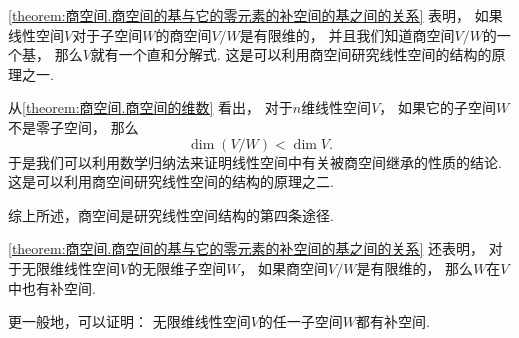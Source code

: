 \cref{theorem:商空间.商空间的基与它的零元素的补空间的基之间的关系} 表明，
如果线性空间\(V\)对于子空间\(W\)的商空间\(V/W\)是有限维的，
并且我们知道商空间\(V/W\)的一个基，
那么\(V\)就有一个直和分解式.
这是可以利用商空间研究线性空间的结构的原理之一.

从\cref{theorem:商空间.商空间的维数} 看出，
对于\(n\)维线性空间\(V\)，
如果它的子空间\(W\)不是零子空间，
那么\[
	\dim(V/W) < \dim V.
\]
于是我们可以利用数学归纳法来证明线性空间中有关被商空间继承的性质的结论.
这是可以利用商空间研究线性空间的结构的原理之二.

综上所述，商空间是研究线性空间结构的第四条途径.

\cref{theorem:商空间.商空间的基与它的零元素的补空间的基之间的关系} 还表明，
对于无限维线性空间\(V\)的无限维子空间\(W\)，
如果商空间\(V/W\)是有限维的，
那么\(W\)在\(V\)中也有补空间.

更一般地，可以证明：
无限维线性空间\(V\)的任一子空间\(W\)都有补空间.

